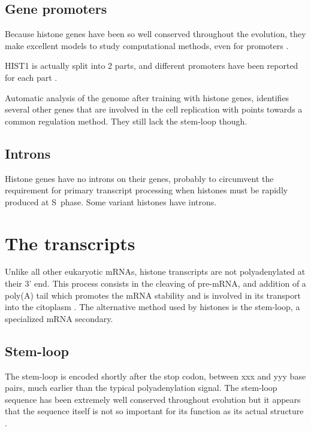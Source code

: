 \documentclass[10pt,a4paper,onecolumn,article]{memoir}
\begin{document}
    \subsection{Gene promoters}

      Because histone genes have been so well conserved throughout the evolution, they make
      excellent models to study computational methods, even for promoters
      \citep{histone-promoter-modeling}.

      HIST1 is actually split into 2 parts, and different promoters have been reported for each
      part \citep{HISTOne-different-transcripts}.

      Automatic analysis of the genome after training with histone genes, identifies
      several other genes that are involved in the cell replication with points
      towards a common regulation method. They still lack the stem-loop though.

    \subsection{Introns}
      Histone genes have no introns on their genes, probably to circumvent the
      requirement for primary transcript processing when histones must be rapidly
      produced at S~phase. Some variant histones have introns.

  \section{The transcripts}
    Unlike all other eukaryotic mRNAs, histone transcripts are not polyadenylated at
    their 3' end. This process consists in the cleaving of pre-mRNA, and addition of a
    poly(A) tail which promotes the mRNA stability and is involved in its transport
    into the citoplasm \citep{mRNA-end-processing}. The alternative method used by
    histones is the stem-loop, a specialized mRNA secondary.

    \subsection{Stem-loop}
      The stem-loop is encoded shortly after the stop codon, between xxx and yyy base
      pairs, much earlier than the typical polyadenylation signal. The stem-loop sequence
      has been extremely well conserved throughout evolution but it appears that the
      sequence itself is not so important for its function as its actual structure
      \citep{stem-loop-structure}.
\end{document}
